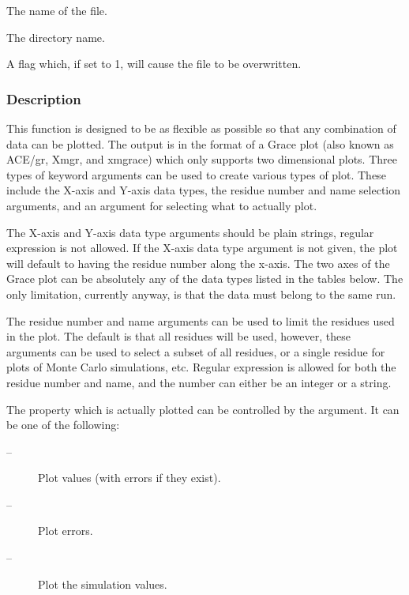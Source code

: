   The name of the file. 

  The directory name. 

  A flag which, if set to 1, will cause the file to be overwritten. 




\subsubsection{Description}

This function is designed to be as flexible as possible so that any combination of data can be plotted.  The output is in the format of a Grace plot (also known as ACE/gr, Xmgr, and xmgrace) which only supports two dimensional plots.  Three types of keyword arguments can be used to create various types of plot.  These include the X-axis and Y-axis data types, the residue number and name selection arguments, and an argument for selecting what to actually plot.


The X-axis and Y-axis data type arguments should be plain strings, regular expression is not allowed.  If the X-axis data type argument is not given, the plot will default to having the residue number along the x-axis.  The two axes of the Grace plot can be absolutely any of the data types listed in the tables below.  The only limitation, currently anyway, is that the data must belong to the same run.


The residue number and name arguments can be used to limit the residues used in the plot. The default is that all residues will be used, however, these arguments can be used to select a subset of all residues, or a single residue for plots of Monte Carlo simulations, etc.  Regular expression is allowed for both the residue number and name, and the number can either be an integer or a string.


The property which is actually plotted can be controlled by the  argument.  It can be one of the following:


\begin{description}
\item[ --]  Plot values (with errors if they exist). 
\item[ --]  Plot errors. 
\item[ --]   Plot the simulation values. 
\end{description}



